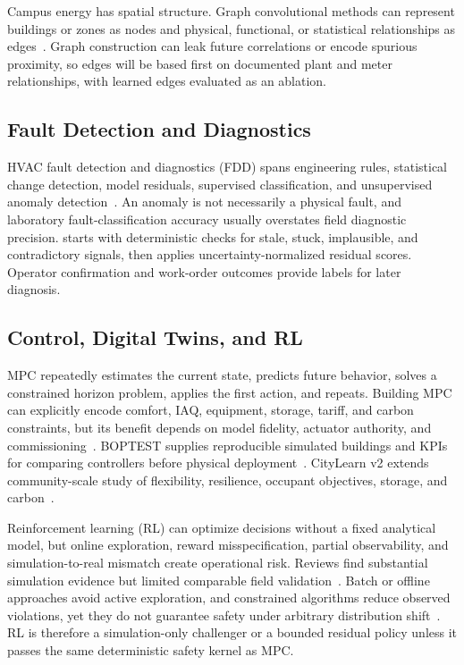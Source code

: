 Campus energy has spatial structure. Graph convolutional methods can represent buildings or zones as nodes and physical, functional, or statistical relationships as edges~\cite{hu2022gcn,liu2025buildstg}. Graph construction can leak future correlations or encode spurious proximity, so edges will be based first on documented plant and meter relationships, with learned edges evaluated as an ablation.

\subsection{Fault Detection and Diagnostics}

HVAC fault detection and diagnostics (FDD) spans engineering rules, statistical change detection, model residuals, supervised classification, and unsupervised anomaly detection~\cite{katipamula2005fdd,chen2022fdd}. An anomaly is not necessarily a physical fault, and laboratory fault-classification accuracy usually overstates field diagnostic precision. \system{} starts with deterministic checks for stale, stuck, implausible, and contradictory signals, then applies uncertainty-normalized residual scores. Operator confirmation and work-order outcomes provide labels for later diagnosis.

\subsection{Control, Digital Twins, and RL}

MPC repeatedly estimates the current state, predicts future behavior, solves a constrained horizon problem, applies the first action, and repeats. Building MPC can explicitly encode comfort, IAQ, equipment, storage, tariff, and carbon constraints, but its benefit depends on model fidelity, actuator authority, and commissioning~\cite{drgona2020mpc}. BOPTEST supplies reproducible simulated buildings and KPIs for comparing controllers before physical deployment~\cite{blum2021boptest}. CityLearn v2 extends community-scale study of flexibility, resilience, occupant objectives, storage, and carbon~\cite{nweye2024citylearn}.

Reinforcement learning (RL) can optimize decisions without a fixed analytical model, but online exploration, reward misspecification, partial observability, and simulation-to-real mismatch create operational risk. Reviews find substantial simulation evidence but limited comparable field validation~\cite{vazquez2019rl}. Batch or offline approaches avoid active exploration, and constrained algorithms reduce observed violations, yet they do not guarantee safety under arbitrary distribution shift~\cite{zhang2022safehvac,garcia2015saferl,achiam2017cpo}. RL is therefore a simulation-only challenger or a bounded residual policy unless it passes the same deterministic safety kernel as MPC.

